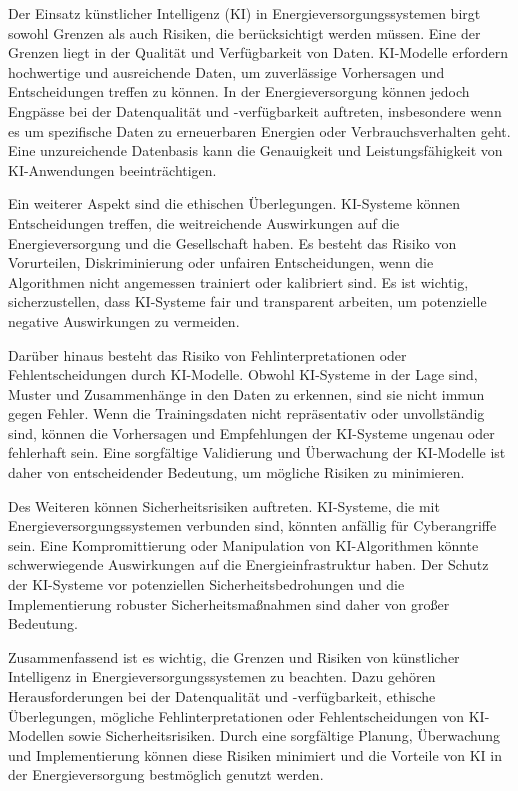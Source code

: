 Der Einsatz künstlicher Intelligenz (KI) in Energieversorgungssystemen birgt
sowohl Grenzen als auch Risiken, die berücksichtigt werden müssen. Eine der
Grenzen liegt in der Qualität und Verfügbarkeit von Daten. KI-Modelle erfordern
hochwertige und ausreichende Daten, um zuverlässige Vorhersagen und
Entscheidungen treffen zu können. In der Energieversorgung können jedoch
Engpässe bei der Datenqualität und -verfügbarkeit auftreten, insbesondere wenn
es um spezifische Daten zu erneuerbaren Energien oder Verbrauchsverhalten geht.
Eine unzureichende Datenbasis kann die Genauigkeit und Leistungsfähigkeit von
KI-Anwendungen beeinträchtigen.

Ein weiterer Aspekt sind die ethischen Überlegungen. KI-Systeme können
Entscheidungen treffen, die weitreichende Auswirkungen auf die
Energieversorgung und die Gesellschaft haben. Es besteht das Risiko von
Vorurteilen, Diskriminierung oder unfairen Entscheidungen, wenn die Algorithmen
nicht angemessen trainiert oder kalibriert sind. Es ist wichtig,
sicherzustellen, dass KI-Systeme fair und transparent arbeiten, um potenzielle
negative Auswirkungen zu vermeiden.

Darüber hinaus besteht das Risiko von Fehlinterpretationen oder
Fehlentscheidungen durch KI-Modelle. Obwohl KI-Systeme in der Lage sind, Muster
und Zusammenhänge in den Daten zu erkennen, sind sie nicht immun gegen Fehler.
Wenn die Trainingsdaten nicht repräsentativ oder unvollständig sind, können die
Vorhersagen und Empfehlungen der KI-Systeme ungenau oder fehlerhaft sein. Eine
sorgfältige Validierung und Überwachung der KI-Modelle ist daher von
entscheidender Bedeutung, um mögliche Risiken zu minimieren.

Des Weiteren können Sicherheitsrisiken auftreten. KI-Systeme, die mit
Energieversorgungssystemen verbunden sind, könnten anfällig für Cyberangriffe
sein. Eine Kompromittierung oder Manipulation von KI-Algorithmen könnte
schwerwiegende Auswirkungen auf die Energieinfrastruktur haben. Der Schutz der
KI-Systeme vor potenziellen Sicherheitsbedrohungen und die Implementierung
robuster Sicherheitsmaßnahmen sind daher von großer Bedeutung.

Zusammenfassend ist es wichtig, die Grenzen und Risiken von künstlicher
Intelligenz in Energieversorgungssystemen zu beachten. Dazu gehören
Herausforderungen bei der Datenqualität und -verfügbarkeit, ethische
Überlegungen, mögliche Fehlinterpretationen oder Fehlentscheidungen von
KI-Modellen sowie Sicherheitsrisiken. Durch eine sorgfältige Planung,
Überwachung und Implementierung können diese Risiken minimiert und die Vorteile
von KI in der Energieversorgung bestmöglich genutzt werden.